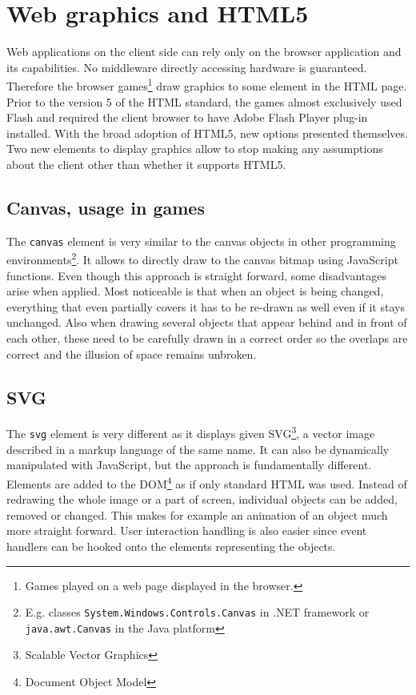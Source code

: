 \documentclass[11pt,oneside, final]{fithesis2}
\begin{document}
\section{Web graphics and HTML5}
Web applications on the client side can rely only on the browser application and its capabilities. No middleware directly accessing hardware is guaranteed. Therefore the browser games\footnote{Games played on a web page displayed in the browser.} draw graphics to some element in the HTML page. Prior to the version 5 of the HTML standard, the games almost exclusively used Flash and required the client browser to have Adobe Flash Player plug-in installed\cite{flashplayer}. With the broad adoption of HTML5, new options presented themselves. Two new elements to display graphics allow to stop making any assumptions about the client other than whether it supports HTML5.

\subsection{Canvas, usage in games}
The \texttt{canvas} element is very similar to the canvas objects in other programming environments\footnote{E.g. classes \texttt{System.Windows.Controls.Canvas} in .NET framework\cite{net_canvas} or \texttt{java.awt.Canvas} in the Java platform\cite{java_canvas}}. It allows to directly draw to the canvas bitmap using JavaScript functions. Even though this approach is straight forward, some disadvantages arise when applied. Most noticeable is that when an object is being changed, everything that even partially covers it has to be re-drawn as well even if it stays unchanged. Also when drawing several objects that appear behind and in front of each other, these need to be carefully drawn in a correct order so the overlaps are correct and the illusion of space remains unbroken.

\subsection{SVG}
The \texttt{svg} element is very different as it displays given SVG\footnote{Scalable Vector Graphics}, a vector image described in a markup language of the same name. It can also be dynamically manipulated with JavaScript, but the approach is fundamentally different. Elements are added to the DOM\footnote{Document Object Model} as if only standard HTML was used. Instead of redrawing the whole image or a part of screen, individual objects can be added, removed or changed. This makes for example an animation of an object much more straight forward. User interaction handling is also easier since event handlers can be hooked onto the elements representing the objects.
\end{document}
